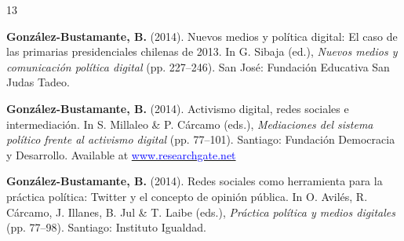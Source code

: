 \begin{publications}
\begin{benumerate}{13}

\item{{\bfseries González-Bustamante, B.} (2014). Nuevos medios y política digital: El caso de las primarias presidenciales chilenas de 2013. In G. Sibaja (ed.), {\itshape Nuevos  medios y comunicación política digital} (pp. 227--246). San José: Fundación Educativa San Judas Tadeo.}\vspace{1mm}


\item{{\bfseries González-Bustamante, B.} (2014). Activismo digital, redes sociales e intermediación. In S. Millaleo \& P. C\'arcamo (eds.), {\itshape Mediaciones del  sistema político frente al activismo digital} (pp. 77--101). Santiago: Fundación Democracia y Desarrollo. Available at \href{https://www.researchgate.net/publication/321992867_Activismo_digital_redes_sociales_e_intermediacion}{\textcolor{blue}{www.researchgate.net}}}\vspace{1mm}


\item{{\bfseries González-Bustamante, B.} (2014). Redes sociales como herramienta para la práctica política: Twitter y el concepto de opinión pública. In O. Avilés, R. Cárcamo, J. Illanes, B. Jul \& T. Laibe (eds.), {\itshape Práctica política y medios digitales} (pp. 77--98). Santiago: Instituto Igualdad.}\vspace{1mm}


\end{benumerate}
\end{publications}

